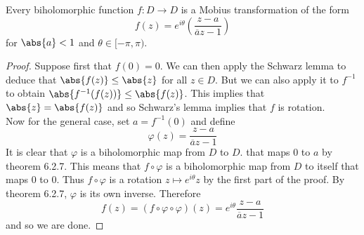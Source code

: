 \documentclass[a4paper]{article}
\begin{document}
\begin{thm}{}{} Every biholomorphic function $f:D\to D$ is a Mobius transformation of the form $$f(z)=e^{i\theta}\left(\frac{z-a}{\overline{a}z-1}\right)$$ for $\abs{a}<1$ and $\theta\in[-\pi,\pi)$. 
\begin{proof}
Suppose first that $f(0)=0$. We can then apply the Schwarz lemma to deduce that $\abs{f(z)}\leq\abs{z}$ for all $z\in D$. But we can also apply it to $f^{-1}$ to obtain $\abs{f^{-1}(f(z))}\leq\abs{f(z)}$. This implies that $\abs{z}=\abs{f(z)}$ and so Schwarz's lemma implies that $f$ is rotation. \\

Now for the general case, set $a=f^{-1}(0)$ and define $$\varphi(z)=\frac{z-a}{\overline{a}z-1}$$ It is clear that $\varphi$ is a biholomorphic map from $D$ to $D$. that maps $0$ to $a$ by theorem 6.2.7. This means that $f\circ\varphi$ is a biholomorphic map from $D$ to itself that maps $0$ to $0$. Thus $f\circ\varphi$ is a rotation $z\mapsto e^{i\theta}z$ by the first part of the proof. By theorem 6.2.7, $\varphi$ is its own inverse. Therefore $$f(z)=(f\circ\varphi\circ\varphi)(z)=e^{i\theta}\frac{z-a}{\overline{a}z-1}$$ and so we are done. 
\end{proof}
\end{thm}
\end{document}
